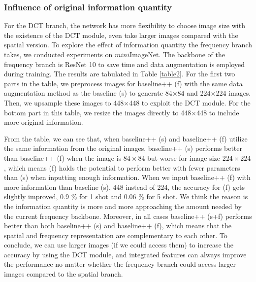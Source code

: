 \documentclass[10pt, conference, compsocconf]{IEEEtran}
\begin{document}
\subsubsection{Influence of original information quantity}

For the DCT branch, the network has more flexibility to choose image size with the existence of the DCT module, even take larger images compared with the spatial version.  To explore the effect of information quantity the frequency branch takes, we conducted experiments on $\textit{mini}$ImageNet. The backbone of the frequency branch is ResNet 10 to save time and data augmentation is employed during training. The results are tabulated in Table \ref{table2}. For the first two parts in the table, we preprocess images for baseline++ (f) {}{with the same data augmentation method} as the baseline (s) to generate 84$\times$84 and 224$\times$224 images. Then, we upsample these images to 448$\times$448 to exploit the DCT module. For the bottom part in this table, we resize the images directly to 448$\times$448 to include more original information. 

From the table, we can see that, when baseline++ (s) and baseline++ (f) utilize the same information from the original images, baseline++ (s) performs better than baseline++ (f) when the image is $84\times 84$ but worse for image size $224\times 224$, which means (f) holds the potential to perform better with fewer parameters than (s) when inputting enough information. When we input baseline++ (f) with more information than baseline (s), 448 instead of 224, the accuracy for (f) gets slightly improved, 0.9 \% for 1 shot and 0.06 \% for 5 shot. We think the reason is the information quantity is more and more approaching the amount needed by the current frequency backbone. Moreover, in all cases baseline++ (s+f) performs better than both baseline++ (s) and baseline++ (f), which means that the spatial and frequency representation are complementary to each other. To conclude, we can use larger images (if we could access them) to increase the accuracy by using the DCT module, and integrated features can always improve the performance no matter whether the frequency branch could access larger images compared to the spatial branch. 
\end{document}
